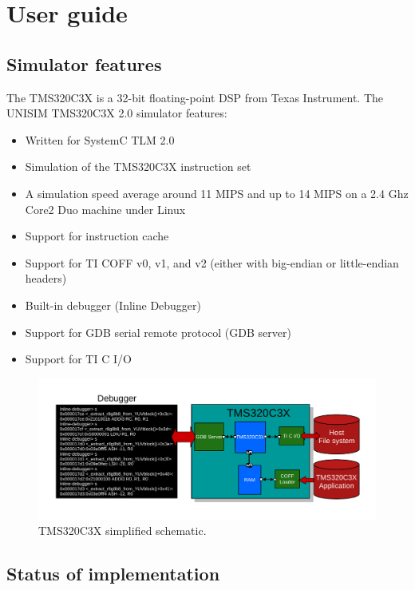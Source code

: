 \section{User guide}

\subsection{Simulator features}

The TMS320C3X is a 32-bit floating-point DSP from Texas Instrument.
The UNISIM TMS320C3X 2.0 simulator features:
\begin{itemize}
\item Written for SystemC TLM 2.0
\item Simulation of the TMS320C3X instruction set
\item A simulation speed average around 11 MIPS and up to 14 MIPS on a 2.4 Ghz Core2 Duo machine under Linux
\item Support for instruction cache
\item Support for TI COFF v0, v1, and v2 (either with big-endian or little-endian headers)
\item Built-in debugger (Inline Debugger)
\item Support for GDB serial remote protocol (GDB server)
\item Support for TI C I/O
\end{itemize}

\begin{figure}[!h]
	\begin{center}
		\includegraphics[width=\textwidth]{tms320c3x/fig_tms320c3x.pdf}
	\end{center}
	\caption{TMS320C3X simplified schematic.}
	\label{fig:tms320c3x}
\end{figure}

\subsection{Status of implementation}

